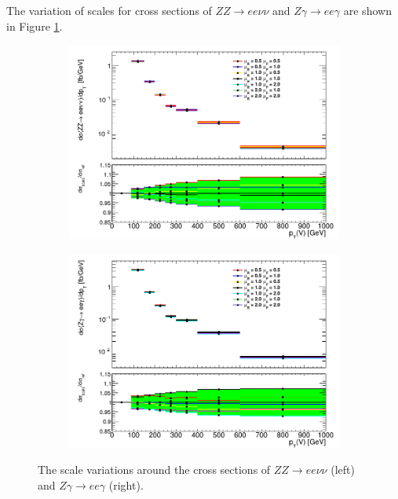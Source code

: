 \documentclass[12pt,a4paper,openright,twoside]{report}
\begin{document}
The variation of scales for cross sections of $ZZ\to ee\nu\nu$ and $Z\gamma\to ee\gamma$ are shown in Figure \ref{fig:scale_xsec}.
\begin{figure}[H]
\centering
	\begin{subfigure}{0.49\textwidth}
		\includegraphics[width=\linewidth]{zz_scale.png}
	\end{subfigure}
	\begin{subfigure}{0.49\textwidth}
		\includegraphics[width=\linewidth]{zg_scale.png}
	\end{subfigure}
	\caption{The scale variations around the cross sections of $ZZ\to ee\nu\nu$ (left) and $Z\gamma\to ee\gamma$ (right).}
	\label{fig:scale_xsec}
\end{figure}
\end{document}
